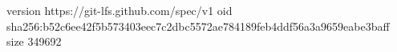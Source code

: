 version https://git-lfs.github.com/spec/v1
oid sha256:b52c6ee42f5b573403eec7c2dbc5572ae784189feb4ddf56a3a9659eabe3baff
size 349692
